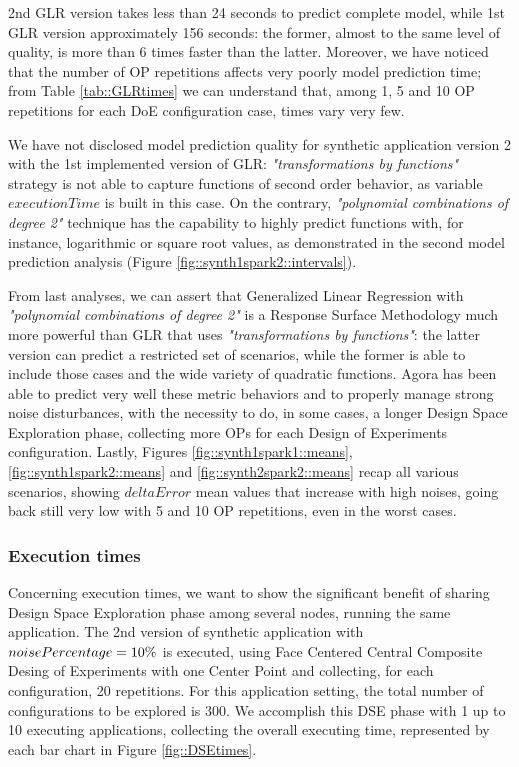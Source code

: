 2nd GLR version takes less than 24 seconds to predict complete model, while 1st GLR version approximately 156 seconds: the former, almost to the same level of quality, is more than 6 times faster than the latter. Moreover, we have noticed that the number of OP repetitions affects very poorly model prediction time; from Table \ref{tab::GLRtimes} we can understand that, among 1, 5 and 10 OP repetitions for each DoE configuration case, times vary very few.

We have not disclosed model prediction quality for synthetic application version 2 with the 1st implemented version of GLR: \textit{"transformations by functions"} strategy is not able to capture functions of second order behavior, as variable $executionTime$ is built in this case. On the contrary, \textit{"polynomial combinations of degree 2"} technique has the capability to highly predict functions with, for instance, logarithmic or square root values, as demonstrated in the second model prediction analysis (Figure \ref{fig::synth1spark2::intervals}).

From last analyses, we can assert that Generalized Linear Regression with \textit{"polynomial combinations of degree 2"} is a Response Surface Methodology much more powerful than GLR that uses \textit{"transformations by functions"}: the latter version can predict a restricted set of scenarios, while the former is able to include those cases and the wide variety of quadratic functions. Agora has been able to predict very well these metric behaviors and to properly manage strong noise disturbances, with the necessity to do, in some cases, a longer Design Space Exploration phase, collecting more OPs for each Design of Experiments configuration. Lastly, Figures \ref{fig::synth1spark1::means}, \ref{fig::synth1spark2::means} and \ref{fig::synth2spark2::means} recap all various scenarios, showing $deltaError$ mean values that increase with high noises, going back still very low with 5 and 10 OP repetitions, even in the worst cases.


\subsubsection{Execution times}

Concerning execution times, we want to show the significant benefit of sharing Design Space Exploration phase among several nodes, running the same application. The 2nd version of synthetic application with $noise\-Percentage = 10\%$ is executed, using Face Centered Central Composite Desing of Experiments with one Center Point and collecting, for each configuration, 20 repetitions. For this application setting, the total number of configurations to be explored is 300. We accomplish this DSE phase with 1 up to 10 executing applications, collecting the overall executing time, represented by each bar chart in Figure \ref{fig::DSEtimes}.

